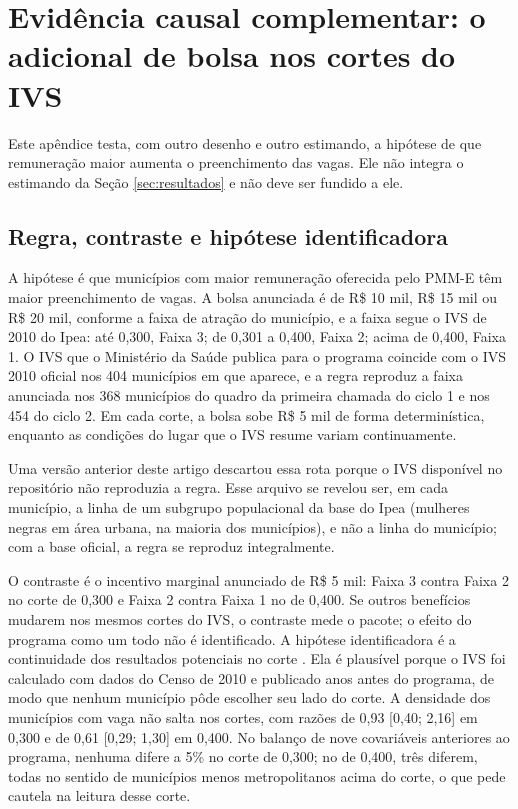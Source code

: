 \documentclass[11pt,a4paper]{article}
\begin{document}
\section{Evidência causal complementar: o adicional de bolsa nos cortes do IVS}
\label{sec:bolsa}

Este apêndice testa, com outro desenho e outro estimando, a hipótese de que
remuneração maior aumenta o preenchimento das vagas. Ele não integra o estimando
da Seção \ref{sec:resultados} e não deve ser fundido a ele.

\subsection{Regra, contraste e hipótese identificadora}

A hipótese é que municípios com maior remuneração oferecida pelo PMM-E têm
maior preenchimento de vagas. A bolsa anunciada é de R\$ 10 mil, R\$ 15 mil ou
R\$ 20 mil, conforme a faixa de atração do município, e a faixa segue o IVS de
2010 do Ipea: até 0,300, Faixa 3; de 0,301 a 0,400, Faixa 2; acima de 0,400,
Faixa 1. O IVS que o Ministério da Saúde publica para o programa coincide com o
IVS 2010 oficial nos 404 municípios em que aparece, e a regra reproduz a faixa
anunciada nos 368 municípios do quadro da primeira chamada do ciclo 1 e nos 454
do ciclo 2. Em cada corte, a bolsa sobe R\$ 5 mil de forma determinística,
enquanto as condições do lugar que o IVS resume variam continuamente.

Uma versão anterior deste artigo descartou essa rota porque o IVS disponível no
repositório não reproduzia a regra. Esse arquivo se revelou ser, em cada
município, a linha de um subgrupo populacional da base do Ipea (mulheres negras
em área urbana, na maioria dos municípios), e não a linha do município; com a
base oficial, a regra se reproduz integralmente.

O contraste é o incentivo marginal anunciado de R\$ 5 mil: Faixa 3 contra
Faixa 2 no corte de 0,300 e Faixa 2 contra Faixa 1 no de 0,400. Se outros
benefícios mudarem nos mesmos cortes do IVS, o contraste mede o pacote; o
efeito do programa como um todo não é identificado. A hipótese identificadora é
a continuidade dos resultados potenciais no corte \citep{leelemieux2010}. Ela é
plausível porque o IVS foi calculado com dados do Censo de 2010 e publicado
anos antes do programa, de modo que nenhum município pôde escolher seu lado do
corte. A densidade dos municípios com vaga não salta nos cortes, com razões de
0,93 [0,40; 2,16] em 0,300 e de 0,61 [0,29; 1,30] em 0,400. No balanço de nove
covariáveis anteriores ao programa, nenhuma difere a 5\% no corte de 0,300; no
de 0,400, três diferem, todas no sentido de municípios menos metropolitanos
acima do corte, o que pede cautela na leitura desse corte.
\end{document}
